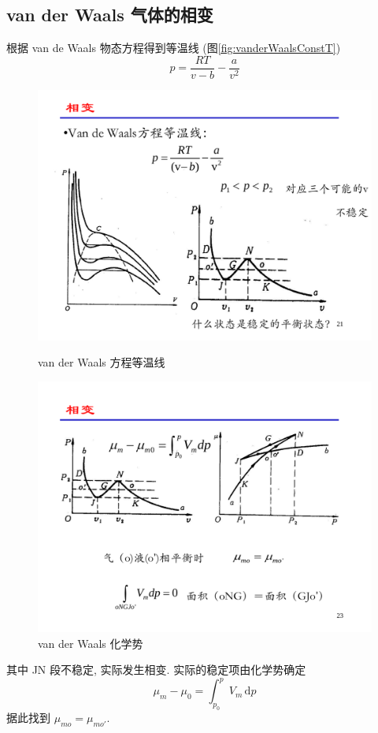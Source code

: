 \documentclass[12pt,a4paper]{article}%
\numberwithin{equation}{section}
\newcommand{\diff}{\,\mathrm{d}}
\begin{document}
\subsection{van der Waals 气体的相变} %
\label{sub:van_der_waals_trans}
根据 van de Waals 物态方程得到等温线 (图\ref{fig:vanderWaalsConstT})
\begin{equation}
    p = \frac{RT}{v-b} - \frac{a}{v^2}
\end{equation}
 \begin{figure}[!ht]
  \begin{minipage}[t]{0.5\linewidth}
    \centering
    \includegraphics[width=0.9\linewidth]{vanderWaalsConstT.pdf}
    \caption{van der Waals 方程等温线\label{fig:vanderWaalsConstT}}
  \end{minipage}%
  \begin{minipage}[t]{0.5\linewidth}
    \centering
    \includegraphics[width=0.9\linewidth]{vanderWaalsMu.pdf}
    \caption{van der Waals 化学势\label{fig:vanderWaalsMu}}
  \end{minipage}
  \end{figure}
其中 JN 段不稳定, 实际发生相变. 实际的稳定项由化学势确定
\begin{equation}
    \mu_m - \mu_0 = \int_{p_0}^p V_m\diff p
\end{equation}
据此找到 $\mu_{mo} = \mu_{mo'}$.
\end{document}
